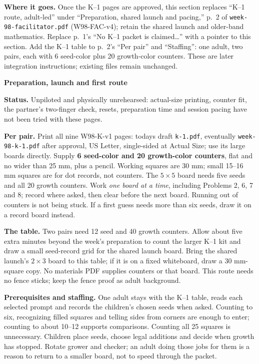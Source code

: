 \documentclass[11pt]{article}
\newcommand{\head}[1]{\par\textbf{\large #1}\par}
\begin{document}
\textbf{Where it goes.} Once the K--1 pages are approved, this section replaces ``K--1 route, adult-led'' under ``Preparation, shared launch and pacing,'' p.\ 2 of \texttt{week-98-facilitator.pdf} (W98-FAC-v4); retain the shared launch and older-band mathematics. Replace p.\ 1's ``No K--1 packet is claimed\ldots'' with a pointer to this section. Add the K--1 table to p.\ 2's ``Per pair'' and ``Staffing'': one adult, two pairs, each with 6 seed-color plus 20 growth-color counters. These are later integration instructions; existing files remain unchanged.

\newpage
\head{Preparation, launch and first route}
\textbf{Status.} Unpiloted and physically unrehearsed: actual-size printing, counter fit, the partner's two-finger check, resets, preparation time and session pacing have not been tried with these pages.

\textbf{Per pair.} Print all nine W98-K-v1 pages: today\textquotesingle s draft \texttt{k-1.pdf}, eventually \texttt{week-98-k-1.pdf} after approval, US Letter, single-sided at Actual Size; use its large boards directly. Supply \textbf{6 seed-color and 20 growth-color counters}, flat and no wider than 25 mm, plus a pencil. Working squares are 30 mm; small 15--16 mm squares are for dot records, not counters. The $5\times5$ board needs five seeds and all 20 growth counters. Work \emph{one board at a time}, including Problems 2, 6, 7 and 8; record where asked, then clear before the next board. Running out of counters is not being stuck. If a first guess needs more than six seeds, draw it on a record board instead.

\textbf{The table.} Two pairs need 12 seed and 40 growth counters. Allow about five extra minutes beyond the week's preparation to count the larger K--1 kit and draw a small seed-record grid for the shared launch board. Bring the shared launch's $2\times3$ board to this table; if it is on a fixed whiteboard, draw a 30 mm-square copy. No materials PDF supplies counters or that board. This route needs no fence sticks; keep the fence proof as adult background.

\textbf{Prerequisites and staffing.} One adult stays with the K--1 table, reads each selected prompt and records the children's chosen seeds when asked. Counting to six, recognizing filled squares and telling sides from corners are enough to enter; counting to about 10--12 supports comparisons. Counting all 25 squares is unnecessary. Children place seeds, choose legal additions and decide when growth has stopped. Rotate grower and checker; an adult doing those jobs for them is a reason to return to a smaller board, not to speed through the packet.
\end{document}
